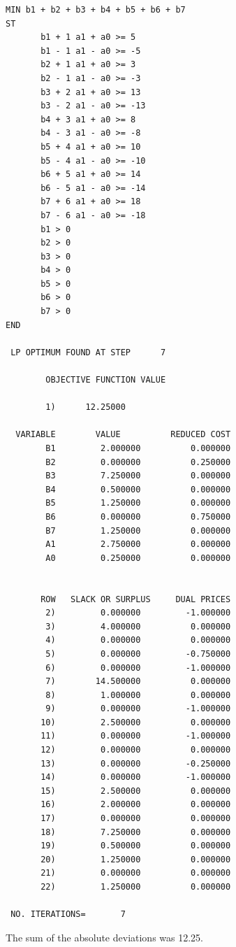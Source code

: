 \documentclass[paper=a4, fontsize=11pt]{scrartcl} %
\numberwithin{equation}{section} %
\numberwithin{figure}{section} %
\numberwithin{table}{section} %
\begin{document}
    \begin{verbatim}
MIN b1 + b2 + b3 + b4 + b5 + b6 + b7
ST
	   b1 + 1 a1 + a0 >= 5
	   b1 - 1 a1 - a0 >= -5
	   b2 + 1 a1 + a0 >= 3
	   b2 - 1 a1 - a0 >= -3
	   b3 + 2 a1 + a0 >= 13
	   b3 - 2 a1 - a0 >= -13
	   b4 + 3 a1 + a0 >= 8
	   b4 - 3 a1 - a0 >= -8
	   b5 + 4 a1 + a0 >= 10
	   b5 - 4 a1 - a0 >= -10
	   b6 + 5 a1 + a0 >= 14
	   b6 - 5 a1 - a0 >= -14
	   b7 + 6 a1 + a0 >= 18
	   b7 - 6 a1 - a0 >= -18
	   b1 > 0
	   b2 > 0
	   b3 > 0
	   b4 > 0
	   b5 > 0
	   b6 > 0
	   b7 > 0
END

 LP OPTIMUM FOUND AT STEP      7

        OBJECTIVE FUNCTION VALUE

        1)      12.25000

  VARIABLE        VALUE          REDUCED COST
        B1         2.000000          0.000000
        B2         0.000000          0.250000
        B3         7.250000          0.000000
        B4         0.500000          0.000000
        B5         1.250000          0.000000
        B6         0.000000          0.750000
        B7         1.250000          0.000000
        A1         2.750000          0.000000
        A0         0.250000          0.000000


       ROW   SLACK OR SURPLUS     DUAL PRICES
        2)         0.000000         -1.000000
        3)         4.000000          0.000000
        4)         0.000000          0.000000
        5)         0.000000         -0.750000
        6)         0.000000         -1.000000
        7)        14.500000          0.000000
        8)         1.000000          0.000000
        9)         0.000000         -1.000000
       10)         2.500000          0.000000
       11)         0.000000         -1.000000
       12)         0.000000          0.000000
       13)         0.000000         -0.250000
       14)         0.000000         -1.000000
       15)         2.500000          0.000000
       16)         2.000000          0.000000
       17)         0.000000          0.000000
       18)         7.250000          0.000000
       19)         0.500000          0.000000
       20)         1.250000          0.000000
       21)         0.000000          0.000000
       22)         1.250000          0.000000

 NO. ITERATIONS=       7
    \end{verbatim}
    
    The sum of the absolute deviations was 12.25.\newline
    
\end{document}
